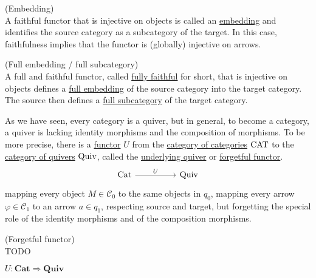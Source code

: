 \begin{definition}{(Embedding)}\label{def:embedding}\\
A faithful functor that is injective on objects is called an \ul{embedding} and identifies the source category
as a subcategory of the target. In this case, faithfulness implies that the functor is (globally) injective on arrows.
\end{definition}

\begin{definition}{(Full embedding / full subcategory)}\label{def:full_fully}\\
A full and faithful functor, called \ul{fully faithful} for short, that is injective on objects defines a \ul{full embedding} of the
source category into the target category. The source then defines a \ul{full subcategory} of the target category.
\end{definition}

\noindent As we have seen, every category is a quiver, but in general, to become a category, a quiver is lacking identity morphisms
and the composition of morphisms. To be more precise, there is a \ul{functor} $U$ from the \ul{category of categories} $\textup{CAT}$ to the
\ul{category of quivers} $\textup{Quiv}$, called the \ul{underlying quiver} or \ul{forgetful functor}.
\[
\begin{tikzcd}
\textup{Cat} \arrow[rr,"U"] &  & \textup{Quiv}
\end{tikzcd}
\]
mapping every object $M \in \mathcal{C}_{0}$ to the same objects in $q_{0}$, mapping every arrow $\varphi \in \mathcal{C}_{1}$ to 
an arrow $a \in q_{1}$, respecting source and target, but forgetting the special role of the identity morphisms and of the composition morphisms.

\begin{example}{(Forgetful functor)}\label{ex:forgetful_functor}\\
TODO

$U : \mathbf{Cat} \Rightarrow \mathbf{Quiv}$
\end{example}

